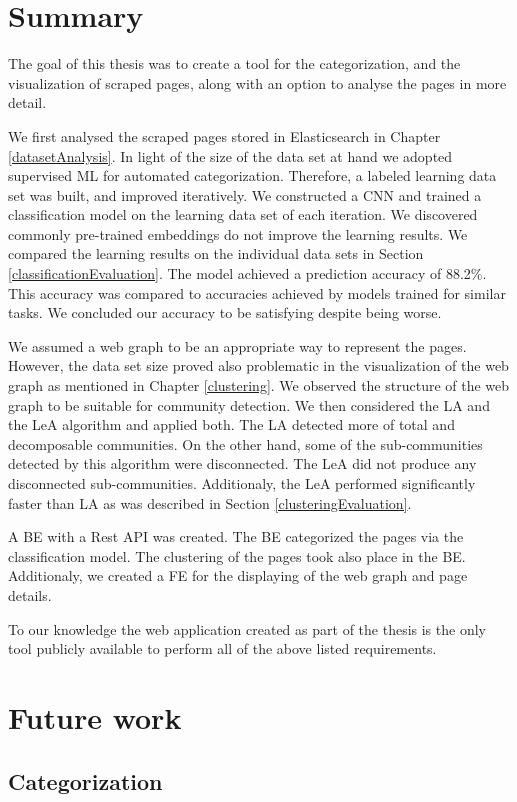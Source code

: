 \label{conclusion}
\section{Summary}
The goal of this thesis was to create a tool for the categorization, and the visualization of scraped pages, along with an option to analyse the pages in more detail.

We first analysed the scraped pages stored in Elasticsearch in Chapter \ref{datasetAnalysis}. In light of the size of the data set at hand we adopted supervised ML for automated categorization. Therefore, a labeled learning data set was built, and improved iteratively. We constructed a CNN and trained a classification model on the learning data set of each iteration. We discovered commonly pre-trained embeddings do not improve the learning results. We compared the learning results on the individual data sets in Section \ref{classificationEvaluation}. The model achieved a prediction accuracy of 88.2\%. This accuracy was compared to accuracies achieved by models trained for similar tasks. We concluded our accuracy to be satisfying despite being worse.

 We assumed a web graph to be an appropriate way to represent the pages. However, the data set size proved also problematic in the visualization of the web graph as mentioned in Chapter \ref{clustering}. We observed the structure of the web graph to be suitable for community detection. We then considered the LA and the LeA algorithm and applied both. The LA detected more of total and decomposable communities. On the other hand, some of the sub-communities detected by this algorithm were disconnected. The LeA did not produce any disconnected sub-communities. Additionaly, the LeA performed significantly faster than LA as was described in Section \ref{clusteringEvaluation}.

A BE with a Rest API was created. The BE categorized the pages via the classification model. The clustering of the pages took also place in the BE. Additionaly, we created a FE for the displaying of the web graph and page details. 

 To our knowledge the web application created as part of the thesis is the only tool publicly available to perform all of the above listed requirements.

\section{Future work}
\subsection{Categorization}

